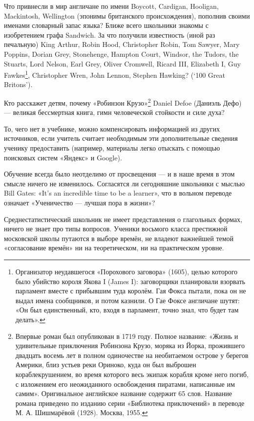 Что привнесли в мир англичане по имени Boycott, Cardigan, Hooligan, Mackintosh, Wellington (эпонимы британского происхождения), пополнив своими именами словарный запас языка? Ближе всего школьники знакомы с изобретением графа Sandwich. За что получили известность (иной раз печальную) King Arthur, Robin Hood, Christopher Robin, Tom Sawyer, Mary Poppins, Dorian Grey, Stonehenge, Hampton Court, Windsor, the Tudors, the Stuarts, Lord Nelson, Earl Grey, Oliver Cromwell, Ricard III, Elizabeth I, Guy Fawkes\footnote{Организатор неудавшегося «Порохового заговора» (1605), целью которого было убийство короля Якова I (James I): заговорщики планировали взорвать парламент вместе с прибывшим туда королём. Гая Фокса пытали, пока он не выдал имена сообщников, и потом казнили. О Гае Фоксе англичане шутят: «Он был единственный, кто, входя в парламент, точно знал, что будет там делать».}, Christopher Wren, John Lennon, Stephen Hawking? (`100 Great Britons').

Кто расскажет детям, почему «Робинзон Крузо»\footnote{Впервые роман был опубликован в 1719 году. Полное название: «Жизнь и удивительные приключения Робинзона Крузо, моряка из Йорка, прожившего двадцать восемь лет в полном одиночестве на необитаемом острове у берегов Америки, близ устьев реки Ориноко, куда он был выброшен кораблекрушением, во время которого весь экипаж корабля кроме него погиб, с изложением его неожиданного освобождения пиратами, написанные им самим». Оригинальное английское название содержит 65 слов. Название романа приведено по изданию серии «Библиотека приключений» в переводе М. А. Шишмарёвой (1928). Москва, 1955.} Daniel Defoe (Даниэль Дефо) — великая бессмертная книга, гимн человеческой стойкости и силе духа?

То, чего нет в учебнике, можно компенсировать информацией из других источников, если учитель считает необходимым эти дополнительные сведения ученику предоставить (например, материалы легко отыскать с помощью поисковых систем «Яндекс» и Google).

Обучение всегда было неотделимо от просвещения — и в наше время в этом смысле ничего не изменилось. Согласятся ли сегодняшние школьники с мыслью Bill Gates: «It’s an incredible time to be a learner», что в вольном переводе означает «Ученичество — лучшая пора в жизни»?

Среднестатистический школьник не имеет представления о глагольных формах, ничего не знает про типы вопросов. Ученики восьмого класса престижной московской школы путаются в выборе времён, не владеют важнейшей темой «согласование времён» ни на теоретическом, ни на практическом уровне.

